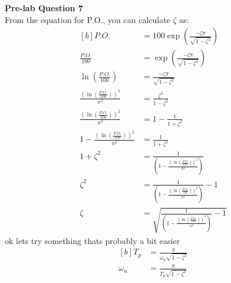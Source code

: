 \documentclass[12pt]{article}
\begin{document}
\textbf{Pre-lab Question 7} \\
From the equation for P.O., you can calculate $\zeta$ as:
\begin{equation}
\begin{aligned}[b]
    P.O. &= 100\exp\left(\frac{-\zeta\pi}{\sqrt{1-\zeta^2}}\right) \\
    \frac{P.O.}{100} &= \exp\left(\frac{-\zeta\pi}{\sqrt{1-\zeta^2}}\right) \\
    \ln \left( \frac{P.O.}{100} \right) &= \frac{-\zeta\pi}{\sqrt{1-\zeta^2}} \\
    \frac{\left( \ln \left( \frac{P.O.}{100} \right) \right)^2}{\pi^2} &= \frac{\zeta^2}{1-\zeta^2} \\
    \frac{\left( \ln \left( \frac{P.O.}{100} \right) \right)^2}{\pi^2} &= 1 - \frac{1}{1+\zeta^2} \\
    1 - \frac{\left( \ln \left( \frac{P.O.}{100} \right) \right)^2}{\pi^2} &= \frac{1}{1+\zeta^2} \\
    1 + \zeta^2 &= \frac{1}{\left( 1 - \frac{\left( \ln \left( \frac{P.O.}{100} \right) \right)^2}{\pi^2} \right)} \\
    \zeta^2 &= \frac{1}{\left( 1 - \frac{\left( \ln \left( \frac{P.O.}{100} \right) \right)^2}{\pi^2} \right)} - 1 \\
    \zeta &= \sqrt{\frac{1}{\left( 1 - \frac{\left( \ln \left( \frac{P.O.}{100} \right) \right)^2}{\pi^2} \right)} - 1}
\end{aligned}
\end{equation}
ok lets try something thats probably a bit easier
\begin{equation}
\begin{aligned}[b]
    T_p &= \frac{\pi}{\omega_n\sqrt{1-\zeta^2}} \\
    \omega_n &= \frac{\pi}{T_p\sqrt{1-\zeta^2}} %
\end{aligned}
\end{equation}
\end{document}
